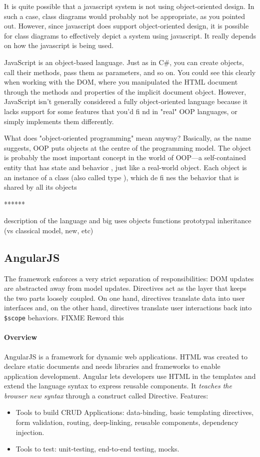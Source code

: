 It is quite possible that a javascript system is not using object-oriented design. In such a case, class diagrams would probably not be appropriate, as you pointed out. However, since javascript does support object-oriented design, it is possible for class diagrams to effectively depict a system using javascript. It really depends on how the javascript is being used.

JavaScript is an
object-based
language. Just as in C\#, you can create objects, call their
methods, pass them as parameters, and so on. You could see this clearly when working
with the DOM, where you manipulated the HTML document through the methods
and properties of the implicit
document
object. However, JavaScript isn't generally
considered a fully object-oriented language because it lacks support for some features
that you'd
fi
nd in "real" OOP languages, or simply implements them differently.

 What does "object-oriented programming" mean anyway? Basically, as the name
suggests, OOP puts objects at the centre of the programming model. The
object
is
probably the most important concept in the world of OOP—a self-contained entity
that has
state
and
behavior
, just like a real-world object. Each object is an instance of a
class
(also called
type
), which de
fi
nes the behavior that is shared by all its objects


******

description of the language and big uses
objects
functions
prototypal inheritance (vs classical model, new, etc)


\subsection{AngularJS}
The framework enforces a very strict separation of responsibilities: \ac{DOM} updates are abstracted away from model updates. 
Directives act as the layer that keeps the two parts loosely coupled.
On one hand, directives translate data into user interfaces and, on the other hand, directives translate user interactions back into \texttt{\$scope} behaviors. FIXME Reword this

\paragraph{Overview} AngularJS is a framework for dynamic web applications.
\ac{HTML} was created to declare static documents and needs libraries and frameworks to enable application development.
Angular lets developers use \ac{HTML} in the templates and extend the language syntax to express reusable components.
It \textit{teaches the browser new syntax} through a construct called Directive.
Features:
\begin{itemize}
    \item Tools to build \ac{CRUD} Applications: data-binding, basic templating directives, form validation, routing, deep-linking, reusable components, dependency injection.
    \item Tools to test: unit-testing, end-to-end testing, mocks.
\end{itemize}

